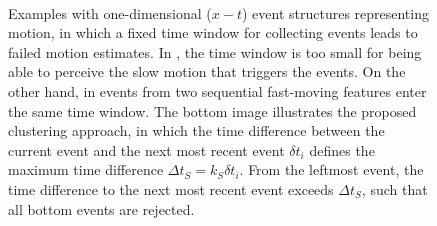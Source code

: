 \begin{figure}[!t]
	\centering
	\setlength{\fwidth}{0.3\linewidth}
	\renewcommand{\ylabeldist}{0.15}
	\subfloat[]{
		
		\label{fig:time_window_1}
	}
	\subfloat[]{
		
		\label{fig:time_window_2}
	}\\
	\subfloat[]{
		
		\label{fig:time_window_3}
	}
	\caption{Examples with one-dimensional ($x-t$) event structures representing motion, in which a fixed time window for collecting events leads to failed motion estimates. In \protect{}, the time window is too small for being able to perceive the slow motion that triggers the events. On the other hand, in \protect{} events from two sequential fast-moving features enter the same time window. The bottom image \protect{} illustrates the proposed clustering approach, in which the time difference between the current event and the next most recent event $\delta t_i$ defines the maximum time difference $\Delta t_S=k_S \delta t_i$. From the leftmost event, the time difference to the next most recent event exceeds $\Delta t_S$, such that all bottom events are rejected.}
	\label{fig:time_window}
\end{figure}
%

